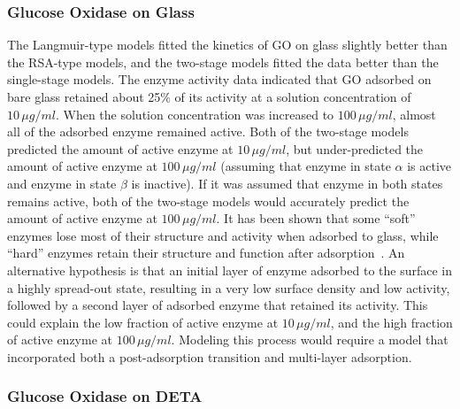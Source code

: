 \subsubsection{Glucose Oxidase on Glass}

The Langmuir-type models fitted the kinetics of GO on glass slightly
better than the RSA-type models, and the two-stage models fitted the
data better than the single-stage models. The enzyme activity data
indicated that GO adsorbed on bare glass retained about 25\% of its
activity at a solution concentration of $10\,\mu g/ml$. When the
solution concentration was increased to $100\,\mu g/ml$, almost all
of the adsorbed enzyme remained active. Both of the two-stage models
predicted the amount of active enzyme at $10\,\mu g/ml$, but under-predicted
the amount of active enzyme at $100\,\mu g/ml$ (assuming that enzyme
in state $\alpha$ is active and enzyme in state $\beta$ is inactive).
If it was assumed that enzyme in both states remains active, both
of the two-stage models would accurately predict the amount of active
enzyme at $100\,\mu g/ml$. It has been shown that some {}``soft''
enzymes lose most of their structure and activity when adsorbed to
glass, while {}``hard'' enzymes retain their structure and function
after adsorption~\cite{Zoungrana1997,Welzel2002}. An alternative
hypothesis is that an initial layer of enzyme adsorbed to the surface
in a highly spread-out state, resulting in a very low surface density
and low activity, followed by a second layer of adsorbed enzyme that
retained its activity. This could explain the low fraction of active
enzyme at $10\,\mu g/ml$, and the high fraction of active enzyme
at $100\,\mu g/ml$. Modeling this process would require a model that
incorporated both a post-adsorption transition and multi-layer adsorption.


\subsubsection{Glucose Oxidase on DETA}

